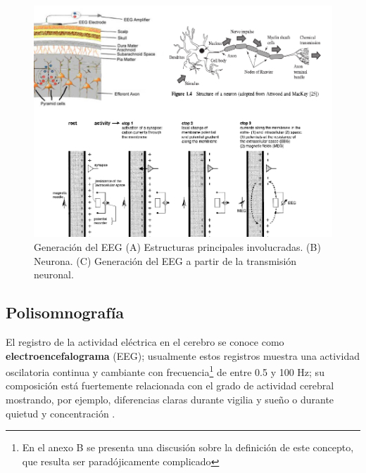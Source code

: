 \begin{figure}
\centering
\includegraphics[width=\linewidth]{./img_diagramas/electrofisiologia.pdf} 
\caption{Generación del EEG (A) Estructuras principales involucradas. (B) Neurona. 
(C) Generación del EEG a partir de la transmisión neuronal.
}
\label{electro_fisio}
\end{figure}


\subsection{Polisomnografía}

El registro de la actividad eléctrica en el cerebro se conoce como \textbf{electroencefalograma} 
(EEG); usualmente estos registros muestra una actividad oscilatoria continua y cambiante con 
frecuencia\footnote{En el anexo B se presenta una discusión sobre la definición de este concepto, 
que resulta ser paradójicamente complicado} de entre 0.5 y 100 Hz; su composición está fuertemente 
relacionada con el grado de actividad cerebral mostrando, por ejemplo, diferencias claras durante 
vigilia y sueño o durante quietud y concentración \cite{Clark98_2}.


